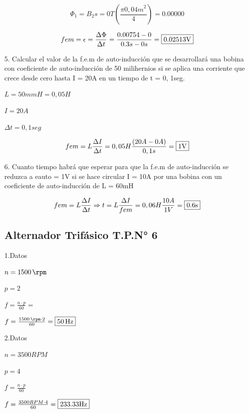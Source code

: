 \documentclass[../main]{subfiles}
\begin{document}
\begin{equation}
  \Phi_1=B_2s=0T (\frac{\pi {0,04m}^2}{4})=0.00000
\end{equation}

\begin{equation}
  fem=\epsilon= \frac{\Delta \Phi}{\Delta t}=\frac{0.00754-0}{0.3s-0s}
  =\fbox{0.02513V}
\end{equation}

5. Calcular el valor de la f.e.m de auto-inducción que se
desarrollará una bobina con coeficiente
de auto-inducción de 50 milihernios si se aplica una corriente que
crece desde cero hasta
I = 20A en un tiempo de  t = 0, 1seg.

$ L=50mmH=0,05H$

$I=20A$

$\Delta t = 0,1seg$

\begin{equation}
  fem=L\frac{\Delta I}{\Delta t }=0,05H\frac{(20A-0A)}{0,1s}=\fbox{1V}
\end{equation}

6. Cuanto tiempo habrá que esperar para que la f.e.m de
auto-inducción se reduzca a eauto = 1V
si se hace circular I = 10A por una bobina con un coeficiente de
auto-inducción de L = 60mH

\begin{equation}
  fem=L\frac{\Delta I}{\Delta t }\Rightarrow t= L \frac{\Delta I}{fem}=
  0,06H \frac{10A}{1V}=\fbox{0.6s}
\end{equation}

\subsection{Alternador Trifásico T.P.N° 6}

\vspace{1cm}
1.Datos

$n=\SI{1500}{\rpm}$

$p=2$

$f=\frac{n\cdot p}{60}=$

$f=\frac{\SI{1500}{\rpm} \cdot 2}{60}=\boxed{\SI{50}{\hertz}}$

\vspace{1cm}

2.Datos

$n=3500RPM$

$p=4$

$f=\frac{n\cdot p}{60} $

$f=\frac{3500RPM\cdot 4}{60}=\fbox{233.33Hz}$
\end{document}
